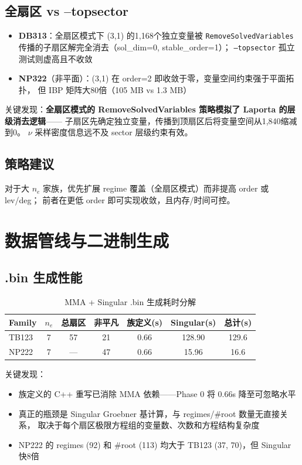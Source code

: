 \documentclass[12pt,a4paper]{article}
\begin{document}
\subsection{全扇区 vs --topsector}
\begin{itemize}[nosep]
    \item \textbf{DB313}：全扇区模式下 (3,1) 的1,168个独立变量被
    \texttt{RemoveSolvedVariables} 传播的子扇区解完全消去（sol\_dim=0, stable\_order=1）；
    \texttt{--topsector} 孤立测试则虚高且不收敛
    \item \textbf{NP322}（非平面）：(3,1) 在 order=2 即收敛于零，变量空间约束强于平面拓扑，
    但 IBP 矩阵大80倍（105 MB vs 1.3 MB）
\end{itemize}

关键发现：\textbf{全扇区模式的 RemoveSolvedVariables 策略模拟了 Laporta 的层级消去逻辑}——
子扇区先确定独立变量，传播到顶扇区后将变量空间从1,840缩减到0。
$\nu$ 采样密度信息远不及 sector 层级约束有效。

\subsection{策略建议}
对于大 $n_e$ 家族，优先扩展 regime 覆盖（全扇区模式）而非提高 order 或 lev/deg；
前者在更低 order 即可实现收敛，且内存/时间可控。

\section{数据管线与二进制生成}

\subsection{.bin 生成性能}

\begin{table}[h]
\centering
\caption{MMA + Singular .bin 生成耗时分解}
\begin{tabular}{lcccccc}
\toprule
Family & $n_e$ & 总扇区 & 非平凡 & 族定义(s) & Singular(s) & 总计(s) \\
\midrule
TB123  & 7 & 57 & 21 & 0.66 & 128.90 & 129.6 \\
NP222  & 7 & — & 47 & 0.66 & 15.96  & 16.6 \\
\bottomrule
\end{tabular}
\end{table}

关键发现：
\begin{itemize}[nosep]
    \item 族定义的 C++ 重写已消除 MMA 依赖——Phase 0 将 0.66s 降至可忽略水平
    \item 真正的瓶颈是 Singular Groebner 基计算，与 regimes/\#root 数量无直接关系，
    取决于每个扇区极限方程组的变量数、次数和方程结构复杂度
    \item NP222 的 regimes (92) 和 \#root (113) 均大于 TB123 (37, 70)，但 Singular 快8倍
\end{itemize}
\end{document}
